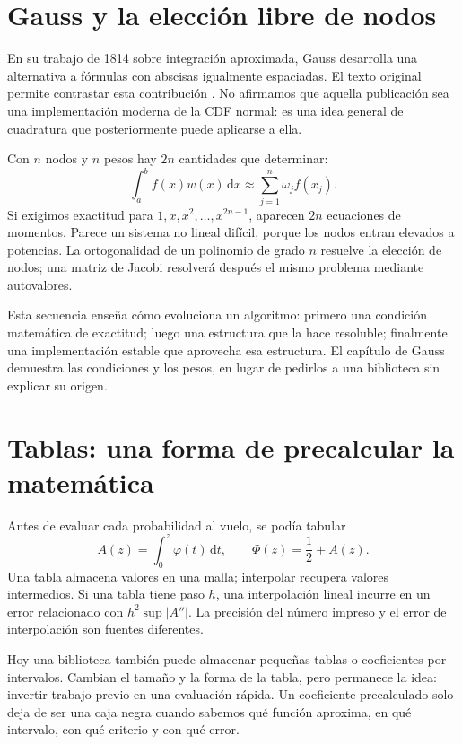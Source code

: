 \documentclass[11pt,a4paper]{article}
\newcommand{\dd}{\,\mathrm d}
\theoremstyle{definition}
\newcounter{problema}
\begin{document}
\section{Gauss y la elección libre de nodos}
En su trabajo de 1814 sobre integración aproximada, Gauss desarrolla una alternativa a fórmulas con abscisas igualmente espaciadas. El texto original permite contrastar esta contribución \cite{gaussnuevo}. No afirmamos que aquella publicación sea una implementación moderna de la CDF normal: es una idea general de cuadratura que posteriormente puede aplicarse a ella.

Con $n$ nodos y $n$ pesos hay $2n$ cantidades que determinar:
\[
\int_a^b f(x)w(x)\dd x\approx\sum_{j=1}^n\omega_jf(x_j).
\]
Si exigimos exactitud para $1,x,x^2,\ldots,x^{2n-1}$, aparecen $2n$ ecuaciones de momentos. Parece un sistema no lineal difícil, porque los nodos entran elevados a potencias. La ortogonalidad de un polinomio de grado $n$ resuelve la elección de nodos; una matriz de Jacobi resolverá después el mismo problema mediante autovalores.

Esta secuencia enseña cómo evoluciona un algoritmo: primero una condición matemática de exactitud; luego una estructura que la hace resoluble; finalmente una implementación estable que aprovecha esa estructura. El capítulo de Gauss demuestra las condiciones y los pesos, en lugar de pedirlos a una biblioteca sin explicar su origen.

\section{Tablas: una forma de precalcular la matemática}
Antes de evaluar cada probabilidad al vuelo, se podía tabular
\[
A(z)=\int_0^z\varphi(t)\dd t,\qquad \Phi(z)=\frac12+A(z).
\]
Una tabla almacena valores en una malla; interpolar recupera valores intermedios. Si una tabla tiene paso $h$, una interpolación lineal incurre en un error relacionado con $h^2\sup|A''|$. La precisión del número impreso y el error de interpolación son fuentes diferentes.

Hoy una biblioteca también puede almacenar pequeñas tablas o coeficientes por intervalos. Cambian el tamaño y la forma de la tabla, pero permanece la idea: invertir trabajo previo en una evaluación rápida. Un coeficiente precalculado solo deja de ser una caja negra cuando sabemos qué función aproxima, en qué intervalo, con qué criterio y con qué error.
\end{document}
